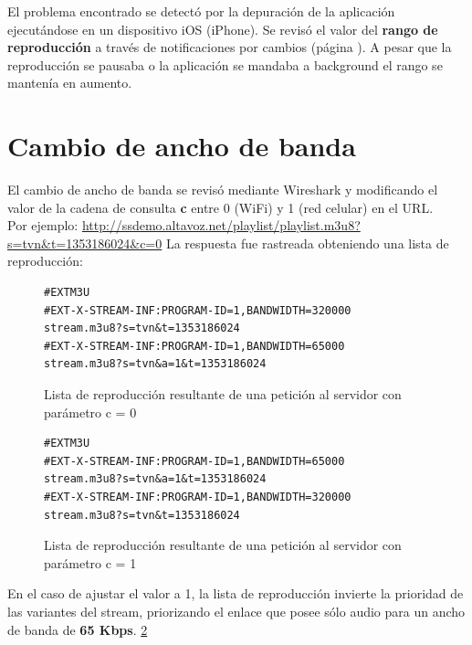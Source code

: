 El problema encontrado se detectó por la depuración de la aplicación ejecutándose en un dispositivo iOS (iPhone). Se revisó el valor del \textbf{rango de reproducción} a través de notificaciones por cambios (página \pageref{item:seekableTimeRanges}). A pesar que la reproducción se pausaba o la aplicación se mandaba a background el rango se mantenía en aumento.


\section{Cambio de ancho de banda}

El cambio de ancho de banda se revisó mediante Wireshark y modificando el valor de la cadena de consulta \textbf{c} entre 0 (WiFi) y 1 (red celular) en el URL.\\ 

Por ejemplo: \url{http://ssdemo.altavoz.net/playlist/playlist.m3u8?s=tvn&t=1353186024&c=0}
La respuesta fue rastreada obteniendo una lista de reproducción:

\begin{figure}[H]
	\centering
\begin{lstlisting}
#EXTM3U
#EXT-X-STREAM-INF:PROGRAM-ID=1,BANDWIDTH=320000
stream.m3u8?s=tvn&t=1353186024
#EXT-X-STREAM-INF:PROGRAM-ID=1,BANDWIDTH=65000
stream.m3u8?s=tvn&a=1&t=1353186024
\end{lstlisting}
\caption{Lista de reproducción resultante de una petición al servidor con parámetro c = 0}
\label{lst:playlistc0}
\end{figure}

\begin{figure}[H]
	\centering
\begin{lstlisting}
#EXTM3U
#EXT-X-STREAM-INF:PROGRAM-ID=1,BANDWIDTH=65000
stream.m3u8?s=tvn&a=1&t=1353186024
#EXT-X-STREAM-INF:PROGRAM-ID=1,BANDWIDTH=320000
stream.m3u8?s=tvn&t=1353186024
\end{lstlisting}
\caption{Lista de reproducción resultante de una petición al servidor con parámetro c = 1}
\label{lst:playlistc1}
\end{figure}

En el caso de ajustar el valor a 1, la lista de reproducción invierte la prioridad de las variantes del stream, priorizando el enlace que posee sólo audio para un ancho de banda de \textbf{65 Kbps}. \ref{lst:playlistc1}

